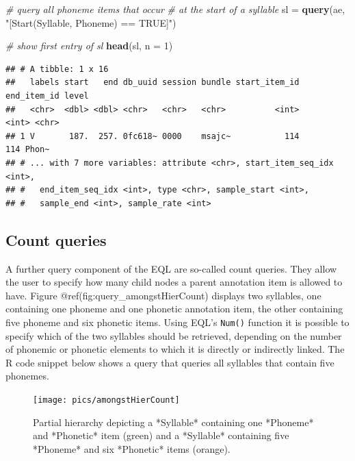 \documentclass[]{book}
\newenvironment{Shaded}{\begin{snugshade}}{\end{snugshade}}
\newcommand{\CommentTok}[1]{\textcolor[rgb]{0.56,0.35,0.01}{\textit{#1}}}
\newcommand{\DataTypeTok}[1]{\textcolor[rgb]{0.13,0.29,0.53}{#1}}
\newcommand{\DecValTok}[1]{\textcolor[rgb]{0.00,0.00,0.81}{#1}}
\newcommand{\KeywordTok}[1]{\textcolor[rgb]{0.13,0.29,0.53}{\textbf{#1}}}
\newcommand{\NormalTok}[1]{#1}
\newcommand{\StringTok}[1]{\textcolor[rgb]{0.31,0.60,0.02}{#1}}
\begin{document}
\begin{Shaded}
\begin{Highlighting}[]
\CommentTok{# query all phoneme items that occur}
\CommentTok{# at the start of a syllable}
\NormalTok{sl =}\StringTok{ }\KeywordTok{query}\NormalTok{(ae, }\StringTok{"[Start(Syllable, Phoneme) == TRUE]"}\NormalTok{)}

\CommentTok{# show first entry of sl}
\KeywordTok{head}\NormalTok{(sl, }\DataTypeTok{n =} \DecValTok{1}\NormalTok{)}
\end{Highlighting}
\end{Shaded}

\begin{verbatim}
## # A tibble: 1 x 16
##   labels start   end db_uuid session bundle start_item_id end_item_id level
##   <chr>  <dbl> <dbl> <chr>   <chr>   <chr>          <int>       <int> <chr>
## 1 V       187.  257. 0fc618~ 0000    msajc~           114         114 Phon~
## # ... with 7 more variables: attribute <chr>, start_item_seq_idx <int>,
## #   end_item_seq_idx <int>, type <chr>, sample_start <int>,
## #   sample_end <int>, sample_rate <int>
\end{verbatim}

\hypertarget{subsec:query_countQueries}{%
\subsection{Count queries}\label{subsec:query_countQueries}}

A further query component of the EQL are so-called count queries. They allow the user to specify how many child nodes a parent annotation item is allowed to have. Figure @ref(fig:query\_amongstHierCount) displays two syllables, one containing one phoneme and one phonetic annotation item, the other containing five phoneme and six phonetic items. Using EQL's \texttt{Num()} function it is possible to specify which of the two syllables should be retrieved, depending on the number of phonemic or phonetic elements to which it is directly or indirectly linked. The R code snippet below shows a query that queries all syllables that contain five phonemes.

\begin{figure}

{\centering \texttt{[image: pics/amongstHierCount]} 

}

\caption{Partial hierarchy depicting a *Syllable* containing one *Phoneme* and  *Phonetic* item (green) and a *Syllable* containing five *Phoneme* and six *Phonetic* items (orange).}\label{fig:query-amongstHierCount}
\end{figure}
\end{document}
